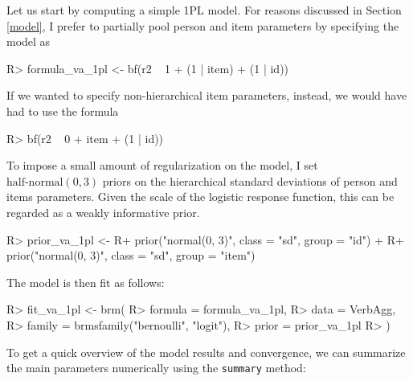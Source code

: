 \documentclass[
]{jss}
\begin{document}
Let us start by computing a simple 1PL model. For reasons discussed in
Section \ref{model}, I prefer to partially pool person and item
parameters by specifying the model as

\begin{CodeChunk}

\begin{CodeInput}
R> formula_va_1pl <- bf(r2 ~ 1 + (1 | item) + (1 | id))
\end{CodeInput}
\end{CodeChunk}

If we wanted to specify non-hierarchical item parameters, instead, we
would have had to use the formula

\begin{CodeChunk}

\begin{CodeInput}
R> bf(r2 ~ 0 + item + (1 | id))
\end{CodeInput}
\end{CodeChunk}

To impose a small amount of regularization on the model, I set
\(\text{half-normal}(0, 3)\) priors on the hierarchical standard
deviations of person and items parameters. Given the scale of the
logistic response function, this can be regarded as a weakly informative
prior.

\begin{CodeChunk}

\begin{CodeInput}
R> prior_va_1pl <- 
R+   prior("normal(0, 3)", class = "sd", group = "id") + 
R+   prior("normal(0, 3)", class = "sd", group = "item")
\end{CodeInput}
\end{CodeChunk}

The model is then fit as follows:

\begin{CodeChunk}

\begin{CodeInput}
R> fit_va_1pl <- brm(
R>   formula = formula_va_1pl,
R>   data = VerbAgg, 
R>   family = brmsfamily("bernoulli", "logit"),
R>   prior = prior_va_1pl
R> )
\end{CodeInput}
\end{CodeChunk}

To get a quick overview of the model results and convergence, we can
summarize the main parameters numerically using the \texttt{summary}
method:
\end{document}
